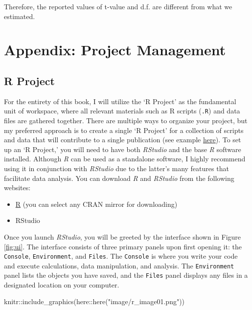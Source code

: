 \documentclass[
]{book}
\newenvironment{Shaded}{\begin{snugshade}}{\end{snugshade}}
\newcommand{\FunctionTok}[1]{\textcolor[rgb]{0.00,0.00,0.00}{#1}}
\newcommand{\NormalTok}[1]{#1}
\newcommand{\SpecialCharTok}[1]{\textcolor[rgb]{0.00,0.00,0.00}{#1}}
\newcommand{\StringTok}[1]{\textcolor[rgb]{0.31,0.60,0.02}{#1}}
\providecommand{\tightlist}{%
  \setlength{\itemsep}{0pt}\setlength{\parskip}{0pt}}
\begin{document}
Therefore, the reported values of t-value and d.f. are different from what we estimated.

\hypertarget{appendix-project-management}{%
\chapter{Appendix: Project Management}\label{appendix-project-management}}

\hypertarget{r-project}{%
\section{R Project}\label{r-project}}

For the entirety of this book, I will utilize the `R Project' as the fundamental unit of workspace, where all relevant materials such as R scripts (\texttt{.R}) and data files are gathered together. There are multiple ways to organize your project, but my preferred approach is to create a single `R Project' for a collection of scripts and data that will contribute to a single publication (see example \href{https://github.com/aterui/public-proj_stream-diversity}{here}). To set up an `R Project,' you will need to have both \emph{RStudio} and the base \emph{R} software installed. Although \emph{R} can be used as a standalone software, I highly recommend using it in conjunction with \emph{RStudio} due to the latter's many features that facilitate data analysis. You can download \emph{R} and \emph{RStudio} from the following websites:

\begin{itemize}
\tightlist
\item
  \href{https://www.r-project.org/}{R} (you can select any CRAN mirror for downloading)
\item
  RStudio
\end{itemize}

Once you launch \emph{RStudio}, you will be greeted by the interface shown in Figure \ref{fig:ui}. The interface consists of three primary panels upon first opening it: the \texttt{Console}, \texttt{Environment}, and \texttt{Files}. The \texttt{Console} is where you write your code and execute calculations, data manipulation, and analysis. The \texttt{Environment} panel lists the objects you have saved, and the \texttt{Files} panel displays any files in a designated location on your computer.

\begin{Shaded}
\begin{Highlighting}[]
\NormalTok{knitr}\SpecialCharTok{::}\FunctionTok{include\_graphics}\NormalTok{(here}\SpecialCharTok{::}\FunctionTok{here}\NormalTok{(}\StringTok{"image/r\_image01.png"}\NormalTok{))}
\end{Highlighting}
\end{Shaded}
\end{document}
